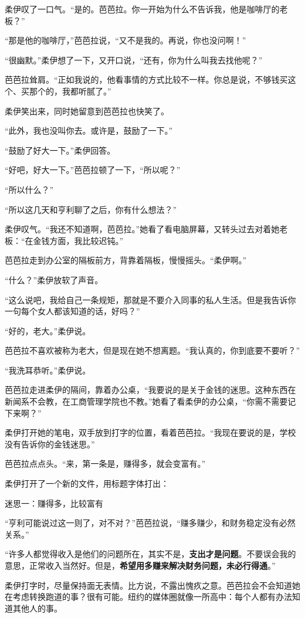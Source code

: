 柔伊叹了一口气。“是的。芭芭拉。你一开始为什么不告诉我，他是咖啡厅的老板？”

“那是他的咖啡厅，”芭芭拉说，“又不是我的。再说，你也没问啊！”

“很幽默。”柔伊想了一下，又开口说，“还有，你为什么叫我去找他呢？”

芭芭拉耸肩。“正如我说的，他看事情的方式比较不一样。你总是说，不够钱买这个、买那个的，我都听腻了。”

柔伊笑出来，同时她留意到芭芭拉也快笑了。

“此外，我也没叫你去。或许是，鼓励了一下。”

“鼓励了好大一下。”柔伊回答。

“好吧，好大一下。”芭芭拉顿了一下，“所以呢？”

“所以什么？”

“所以这几天和亨利聊了之后，你有什么想法？”

柔伊叹气。“我还不知道啊，芭芭拉。”她看了看电脑屏幕，又转头过去对着她老板：“在金钱方面，我比较迟钝。”

芭芭拉走到办公室的隔板前方，背靠着隔板，慢慢摇头。“柔伊啊。”

“什么？”柔伊放软了声音。

“这么说吧，我给自己一条规矩，那就是不要介入同事的私人生活。但是我告诉你一句每个女人都该知道的话，好吗？”

“好的，老大。”柔伊说。

芭芭拉不喜欢被称为老大，但是现在她不想离题。“我认真的，你到底要不要听？”

“我洗耳恭听。”柔伊说。

芭芭拉走进柔伊的隔间，靠着办公桌，“我要说的是关于金钱的迷思。这种东西在新闻系不会教，在工商管理学院也不教。”她看了看柔伊的办公桌，“你需不需要记下来啊？”

柔伊打开她的笔电，双手放到打字的位置，看着芭芭拉。“我现在要说的是，学校没有告诉你的金钱迷思。”

芭芭拉点点头。“来，第一条是，赚得多，就会变富有。”

柔伊打开了一个新的文件，用标题字体打出：

{\kaishu 迷思一：赚得多，比较富有}

“亨利可能说过这一则了，对不对？”芭芭拉说，“赚多赚少，和财务稳定没有必然关系。”

“许多人都觉得收入是他们的问题所在，其实不是，\textbf{支出才是问题}。不要误会我的意思，正常收入当然好。但是，\textbf{希望用多赚来解决财务问题，未必行得通}。”

柔伊打字时，尽量保持面无表情。比方说，不露出愧疚之意。芭芭拉会不会知道她在考虑转换跑道的事？很有可能。纽约的媒体圈就像一所高中：每个人都有办法知道其他人的事。

